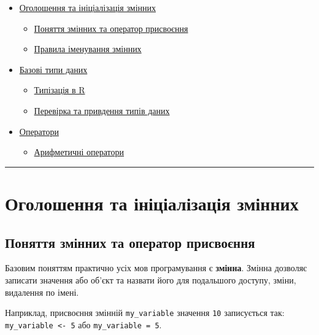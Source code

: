 \documentclass[
]{book}
\providecommand{\tightlist}{%
  \setlength{\itemsep}{0pt}\setlength{\parskip}{0pt}}
\begin{document}
\begin{itemize}
\tightlist
\item
  \protect\hyperlink{chapter21}{Оголошення та ініціалізація змінних}

  \begin{itemize}
  \tightlist
  \item
    \protect\hyperlink{chapter211}{Поняття змінних та оператор присвоєння}
  \item
    \protect\hyperlink{chapter212}{Правила іменування змінних}
  \end{itemize}
\item
  \protect\hyperlink{chapter22}{Базові типи даних}

  \begin{itemize}
  \tightlist
  \item
    \protect\hyperlink{chapter221}{Типізація в R}
  \item
    \protect\hyperlink{chapter222}{Перевірка та привдення типів даних}
  \end{itemize}
\item
  \protect\hyperlink{chapter23}{Оператори}

  \begin{itemize}
  \tightlist
  \item
    \protect\hyperlink{chapter231}{Арифметичні оператори}
  \end{itemize}
\end{itemize}

\begin{center}\rule{0.5\linewidth}{0.5pt}\end{center}

\hypertarget{chapter21}{%
\section{Оголошення та ініціалізація змінних}\label{chapter21}}

\hypertarget{chapter211}{%
\subsection{Поняття змінних та оператор присвоєння}\label{chapter211}}

Базовим поняттям практично усіх мов програмування є \textbf{змінна}. Змінна дозволяє записати значення або об'єкт та назвати його для подальшого доступу, зміни, видалення по імені.

Наприклад, присвоєння змінній \texttt{my\_variable} значення \texttt{10} записується так: \texttt{my\_variable\ \textless{}-\ 5} або \texttt{my\_variable\ =\ 5}.
\end{document}
